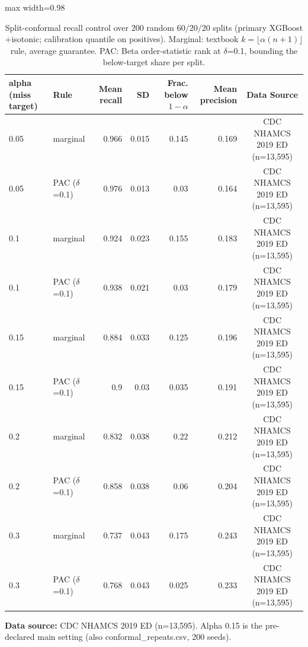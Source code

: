 \begin{table}[t]
\centering
\caption{Split-conformal recall control over 200 random 60$/$20$/$20 splits (primary XGBoost$+$isotonic; calibration quantile on positives). Marginal: textbook $k=\lfloor\alpha(n+1)\rfloor$ rule, average guarantee. PAC: Beta order-statistic rank at $\delta$=0.1, bounding the below-target share per split.}
\label{tab:conformal}
\begin{adjustbox}{max width=0.98\textwidth}
\begin{tabular}{llrrrrc}
\toprule
alpha (miss target) & Rule & Mean recall & SD & Frac. below $1-\alpha$ & Mean precision & Data Source \\
\midrule
0.05 & marginal & 0.966 & 0.015 & 0.145 & 0.169 & CDC NHAMCS 2019 ED (n=13,595) \\
0.05 & PAC ($\delta$=0.1) & 0.976 & 0.013 & 0.03 & 0.164 & CDC NHAMCS 2019 ED (n=13,595) \\
0.1 & marginal & 0.924 & 0.023 & 0.155 & 0.183 & CDC NHAMCS 2019 ED (n=13,595) \\
0.1 & PAC ($\delta$=0.1) & 0.938 & 0.021 & 0.03 & 0.179 & CDC NHAMCS 2019 ED (n=13,595) \\
0.15 & marginal & 0.884 & 0.033 & 0.125 & 0.196 & CDC NHAMCS 2019 ED (n=13,595) \\
0.15 & PAC ($\delta$=0.1) & 0.9 & 0.03 & 0.035 & 0.191 & CDC NHAMCS 2019 ED (n=13,595) \\
0.2 & marginal & 0.832 & 0.038 & 0.22 & 0.212 & CDC NHAMCS 2019 ED (n=13,595) \\
0.2 & PAC ($\delta$=0.1) & 0.858 & 0.038 & 0.06 & 0.204 & CDC NHAMCS 2019 ED (n=13,595) \\
0.3 & marginal & 0.737 & 0.043 & 0.175 & 0.243 & CDC NHAMCS 2019 ED (n=13,595) \\
0.3 & PAC ($\delta$=0.1) & 0.768 & 0.043 & 0.025 & 0.233 & CDC NHAMCS 2019 ED (n=13,595) \\
\bottomrule
\end{tabular}
\end{adjustbox}
\par\vspace{2pt}\raggedright\footnotesize \textbf{Data source:} CDC NHAMCS 2019 ED (n=13,595). Alpha 0.15 is the pre-declared main setting (also conformal\_repeats.csv, 200 seeds).
\end{table}
